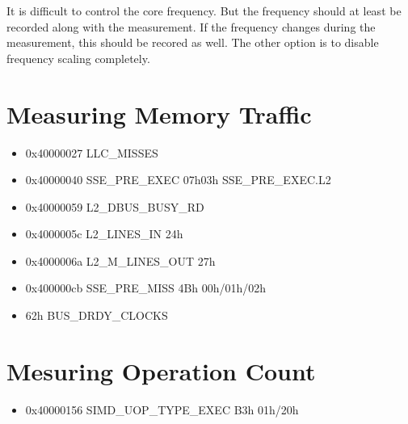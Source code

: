 \documentclass[a4paper,12pt]{article}
\begin{document}
It is difficult to control the core frequency. But the frequency should at least be recorded along with the measurement. If the frequency changes during the measurement, this should be recored as well. The other option is to disable frequency scaling completely.

\section{Measuring Memory Traffic}
\begin{itemize}
\item 0x40000027   LLC_MISSES
\item 0x40000040   SSE_PRE_EXEC 07h03h SSE_PRE_EXEC.L2
\item 0x40000059   L2_DBUS_BUSY_RD
\item 0x4000005c   L2_LINES_IN  24h
\item 0x4000006a   L2_M_LINES_OUT  27h
\item 0x400000cb   SSE_PRE_MISS 4Bh 00h/01h/02h
\item 62h BUS_DRDY_CLOCKS
\end{itemize}


\section{Mesuring Operation Count}
\begin{itemize}
\item 0x40000156   SIMD_UOP_TYPE_EXEC B3h 01h/20h
\end{itemize}





\end{document}
